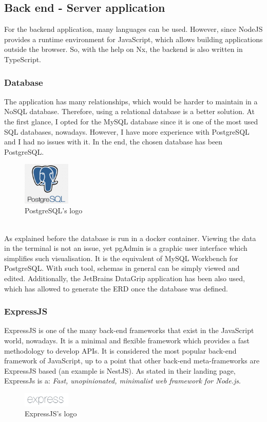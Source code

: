 \documentclass[a4paper, 12pt, oneside]{book}
\begin{document}
\subsection{Back end - Server application}
For the backend application, many languages can be used. However, since NodeJS provides a runtime environment for JavaScript, which allows building applications outside the browser. So, with the help on Nx, the backend is also written in TypeScript.
\subsubsection{Database}
The application has many relationships, which would be harder to maintain in a NoSQL database. Therefore, using a relational database is a better solution. At the first glance, I opted for the MySQL database since it is one of the most used SQL databases, nowadays. However, I have more experience with PostgreSQL and I had no issues with it. In the end, the chosen database has been PostgreSQL.
\\
\begin{figure}[h!]
	\centering
	\includegraphics[width=0.2\textwidth]{assets/postgres-logo.png}
	\caption{PostgreSQL's logo}
\end{figure}
\\
As explained before the database is run in a docker container. Viewing the data in the terminal is not an issue, yet pgAdmin is a graphic user interface which simplifies such visualisation. It is the equivalent of MySQL Workbench for PostgreSQL. With such tool, schemas in general can be simply viewed and edited. Additionally, the JetBrains DataGrip application has been also used, which has allowed to generate the ERD once the database was defined.
\subsubsection{ExpressJS}
ExpressJS is one of the many back-end frameworks that exist in the JavaScript world, nowadays. It is a minimal and flexible framework which provides a fast methodology to develop APIs. It is considered the most popular back-end framework of JavaScript, up to a point that other back-end meta-frameworks are ExpressJS based (an example is NestJS). As stated in their landing page, ExpressJs is a: \emph{Fast, unopinionated, minimalist web framework for Node.js}.
\\
\begin{figure}[h!]
	\centering
	\includegraphics[width=0.2\textwidth]{assets/express-logo.png}
	\caption{ExpressJS's logo}
\end{figure}
\end{document}
